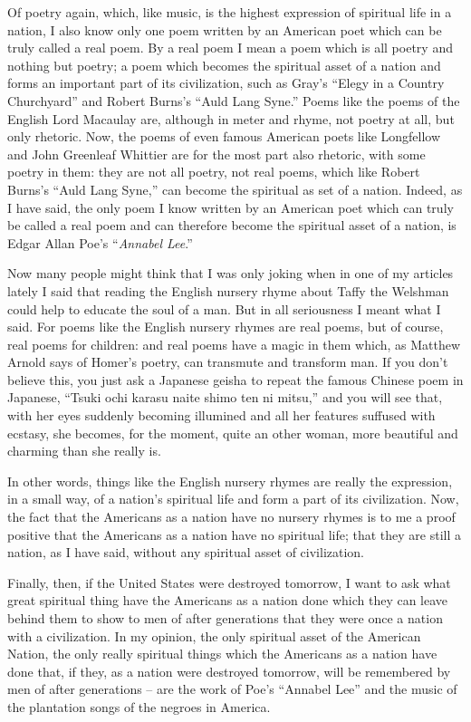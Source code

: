 Of poetry again, which, like music, is the highest expression of spiritual life in a nation,
I also know only one poem written by an American poet which can be truly called a real poem.
By a real poem I mean a poem which is all poetry and nothing but poetry;
a poem which becomes the spiritual asset of a nation and forms an important part of its civilization,
such as Gray's ``Elegy in a Country Churchyard'' and Robert Burns's ``Auld Lang Syne.''
Poems like the poems of the English Lord Macaulay are, although in meter and rhyme,
not poetry at all, but only rhetoric.
Now, the poems of even famous American poets like Longfellow and John Greenleaf Whittier are for the most part also rhetoric,
with some poetry in them: they are not all poetry,
not real poems, which like Robert Burns's ``Auld Lang Syne,'' can become the spiritual as set of a nation.
Indeed, as I have said, the only poem I know written by an American poet which can truly be called a real poem and can therefore become the spiritual asset of a nation,
is Edgar Allan Poe's ``\emph{Annabel Lee}.''

Now many people might think that I was only joking when in one of my articles lately I said
that reading the English nursery rhyme about Taffy the Welshman could help to educate the soul of a man.
But in all seriousness I meant what I said.
For poems like the English nursery rhymes are real poems,
but of course, real poems for children: and real poems have a magic in them which,
as Matthew Arnold says of Homer's poetry, can transmute and transform man.
If you don't believe this, you just ask a Japanese geisha to repeat the famous Chinese poem in Japanese,
``Tsuki ochi karasu naite shimo ten ni mitsu,'' and you will see that,
with her eyes suddenly becoming illumined and all her features suffused with ecstasy, she becomes,
for the moment, quite an other woman, more beautiful and charming than she really is. 

In other words, things like the English nursery rhymes are really the expression, in a small way, of a nation's spiritual life and form a part of its civilization.
Now, the fact that the Americans as a nation have no nursery rhymes is to me a proof positive
that the Americans as a nation have no spiritual life;
that they are still a nation, as I have said,
without any spiritual asset of civilization. 

Finally, then, if the United States were destroyed tomorrow,
I want to ask what great spiritual thing have the Americans as a nation done which they can leave behind them to show to men of after generations that they were once a nation with a civilization.
In my opinion, the only spiritual asset of the American Nation,
the only really spiritual things which the Americans as a nation have done that,
if they, as a nation were destroyed tomorrow,
will be remembered by men of after generations
-- are the work of Poe's ``Annabel Lee'' and the music of the plantation songs of the negroes in America.

